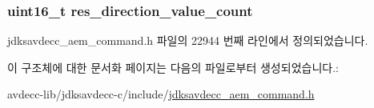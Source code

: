 \subsubsection[{\texorpdfstring{res\+\_\+direction\+\_\+value\+\_\+count}{res_direction_value_count}}]{\setlength{\rightskip}{0pt plus 5cm}uint16\+\_\+t res\+\_\+direction\+\_\+value\+\_\+count}\hypertarget{structjdksavdecc__aem__command__get__matrix__response_a0f34ba05787e5027402de5f250c3a5a6}{}\label{structjdksavdecc__aem__command__get__matrix__response_a0f34ba05787e5027402de5f250c3a5a6}


jdksavdecc\+\_\+aem\+\_\+command.\+h 파일의 22944 번째 라인에서 정의되었습니다.



이 구조체에 대한 문서화 페이지는 다음의 파일로부터 생성되었습니다.\+:\begin{DoxyCompactItemize}
\item 
avdecc-\/lib/jdksavdecc-\/c/include/\hyperlink{jdksavdecc__aem__command_8h}{jdksavdecc\+\_\+aem\+\_\+command.\+h}\end{DoxyCompactItemize}
